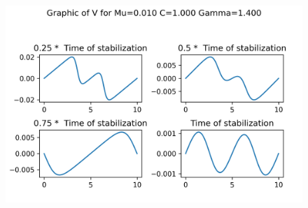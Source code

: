 \begin{figure}[H]
	\includegraphics[scale=0.5]{../graphs_data_nonsmooth_1/slices/Graph_V_mu0.010_C1.000_gamma1.400.png}
\end{figure}

